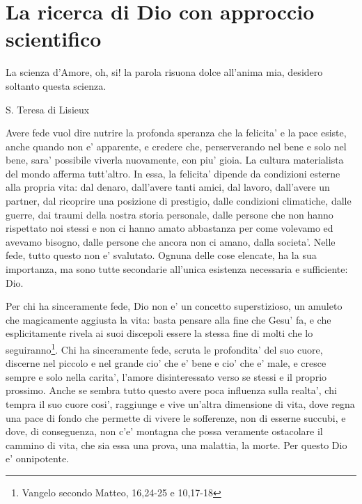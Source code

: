 \chapter{La ricerca di Dio con approccio scientifico}
\label{chapterDio}

\epigraph{
     La scienza d'Amore, oh, si! la parola risuona dolce all'anima mia, desidero soltanto questa scienza.
 }{S. Teresa di Lisieux}

Avere fede vuol dire nutrire la profonda speranza che la felicita' e la pace esiste, anche quando non e' apparente, e credere che, perserverando nel bene e solo nel bene, sara' possibile viverla nuovamente, con piu' gioia. La cultura materialista del mondo afferma tutt'altro. In essa, la felicita' dipende da condizioni esterne alla propria vita: dal denaro, dall'avere tanti amici, dal lavoro, dall'avere un partner, dal ricoprire una posizione di prestigio, dalle condizioni climatiche, dalle guerre, dai traumi della nostra storia personale, dalle persone che non hanno rispettato noi stessi e non ci hanno amato abbastanza per come volevamo ed avevamo bisogno, dalle persone che ancora non ci amano, dalla societa'. Nelle fede, tutto questo non e' svalutato. Ognuna delle cose elencate, ha la sua importanza, ma sono tutte secondarie all'unica esistenza necessaria e sufficiente: Dio.

Per chi ha sinceramente fede, Dio non e' un concetto superstizioso, un amuleto che magicamente aggiusta la vita: basta pensare alla fine che Gesu' fa, e che esplicitamente rivela ai suoi discepoli essere la stessa fine di molti che lo seguiranno\footnote{Vangelo secondo Matteo, 16,24-25 e 10,17-18}. Chi ha sinceramente fede, scruta le profondita' del suo cuore, discerne nel piccolo e nel grande cio' che e' bene e cio' che e' male, e cresce sempre e solo nella carita', l'amore disinteressato verso se stessi e il proprio prossimo.
Anche se sembra tutto questo avere poca influenza sulla realta', chi tempra il suo cuore cosi', raggiunge e vive un'altra dimensione di vita, dove regna una pace di fondo che permette di vivere le sofferenze, non di esserne succubi, e dove, di conseguenza, non c'e' montagna che possa veramente ostacolare il cammino di vita, che sia essa una prova, una malattia, la morte. Per questo Dio e' onnipotente.


